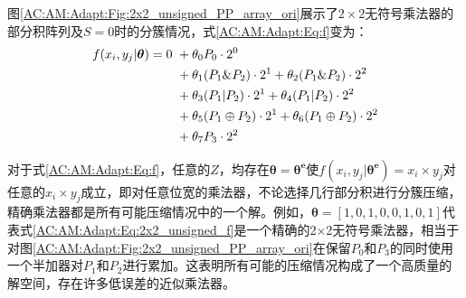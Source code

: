 图\ref{AC:AM:Adapt:Fig:2x2_unsigned_PP_array_ori}展示了$2\times2$无符号乘法器的部分积阵列及$S = 0$时的分簇情况，式\eqref{AC:AM:Adapt:Eq:f}变为：
\begin{align}
      f(x_i, y_j \vert \boldsymbol{\theta}) = 0 
       &\ + \theta_0 P_0 \cdot 2^0 \notag \notag \\
       &\ + \theta_1 ( P_1 \& P_2 ) \cdot 2^1 + \theta_2 ( P_1 \& P_2 ) \cdot 2^2 \notag \\
       &\ + \theta_3 ( P_1 | P_2 ) \cdot 2^1 + \theta_4 ( P_1 | P_2 ) \cdot 2^2 \notag \\
       &\ + \theta_5 ( P_1 \oplus P_2 ) \cdot 2^1 + \theta_6 ( P_1 \oplus P_2 ) \cdot 2^2 \notag \\
       &\ +\theta_7 P_3 \cdot 2^2
       \label{AC:AM:Adapt:Eq:2x2_unsigned_f}
\end{align}

对于式\eqref{AC:AM:Adapt:Eq:f}，任意的$Z$，均存在$\boldsymbol{\theta} = \boldsymbol{{\theta}^{e}}$使$f(x_i, y_j \vert \boldsymbol{{\theta}^{e}}) =  x_i \times y_j$对任意的$x_i \times y_j$成立，即对任意位宽的乘法器，不论选择几行部分积进行分簇压缩，精确乘法器都是所有可能压缩情况中的一个解。例如，$\boldsymbol{\theta} = [1, 0, 1, 0, 0, 1, 0, 1]$代表式\eqref{AC:AM:Adapt:Eq:2x2_unsigned_f}是一个精确的2$\times$2无符号乘法器，相当于对图\ref{AC:AM:Adapt:Fig:2x2_unsigned_PP_array_ori}在保留$P_0$和$P_3$的同时使用一个半加器对$P_1$和$P_2$进行累加。这表明所有可能的压缩情况构成了一个高质量的解空间，存在许多低误差的近似乘法器。

